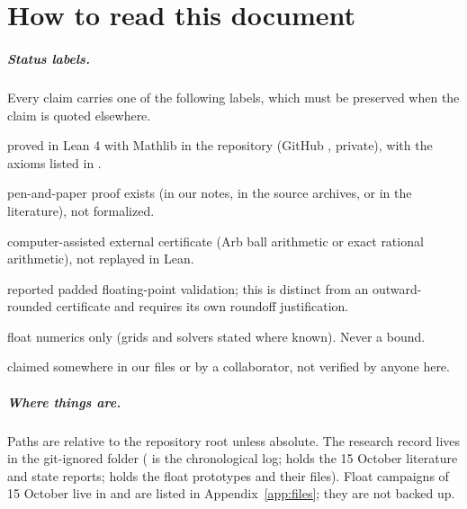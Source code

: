 \chapter*{How to read this document}

\paragraph{Status labels.} Every claim carries one of the following labels, which must be preserved when the claim is
quoted elsewhere.
\begin{description}[style=nextline]
\item[\st{L}] proved in Lean 4 with Mathlib in the repository  (GitHub , private), with the axioms listed in .
\item[\st{P}] pen-and-paper proof exists (in our notes, in the source archives, or in the literature), not formalized.
\item[\st{C}] computer-assisted external certificate (Arb ball arithmetic or exact rational arithmetic), not replayed in Lean.
\item[\st{C$_{\rm float}$}] reported padded floating-point validation; this is distinct from an outward-rounded certificate and requires its own roundoff justification.
\item[\st{F}] float numerics only (grids and solvers stated where known). Never a bound.
\item[\st{?}] claimed somewhere in our files or by a collaborator, not verified by anyone here.
\end{description}

\paragraph{Where things are.} Paths are relative to the repository root 
unless absolute. The research record lives in the git-ignored folder 
( is the chronological log;  holds the 15 October literature and state reports;
 holds the float prototypes and their  files). Float campaigns of 15 October live in
 and are listed in Appendix~\ref{app:files}; they are not backed up.

